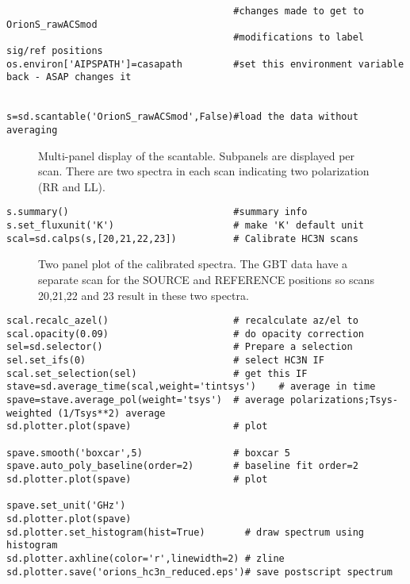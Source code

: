 \begin{verbatim}
                                        #changes made to get to OrionS_rawACSmod
                                        #modifications to label sig/ref positions
os.environ['AIPSPATH']=casapath         #set this environment variable back - ASAP changes it


s=sd.scantable('OrionS_rawACSmod',False)#load the data without averaging                
\end{verbatim}
\normalsize

\begin{figure}[h!]
\caption{\label{fig:scantable} Multi-panel display of the
  scantable. Subpanels are displayed per scan. There are two 
  spectra in each scan indicating two polarization (RR and LL).} 
\hrulefill
\end{figure}
 
\small
\begin{verbatim}
s.summary()                             #summary info                                   
s.set_fluxunit('K')                     # make 'K' default unit
scal=sd.calps(s,[20,21,22,23])          # Calibrate HC3N scans                          
\end{verbatim}
\normalsize

\begin{figure}[h!]
\caption{\label{fig:scal} Two panel plot of the calibrated
  spectra. The GBT data have a separate scan for the SOURCE and
  REFERENCE positions so scans 20,21,22 and 23 result in these two
  spectra.} 
\hrulefill
\end{figure}

\small
\begin{verbatim}
scal.recalc_azel()                      # recalculate az/el to                          
scal.opacity(0.09)                      # do opacity correction                         
sel=sd.selector()                       # Prepare a selection
sel.set_ifs(0)                          # select HC3N IF
scal.set_selection(sel)                 # get this IF
stave=sd.average_time(scal,weight='tintsys')    # average in time
spave=stave.average_pol(weight='tsys')  # average polarizations;Tsys-weighted (1/Tsys**2) average
sd.plotter.plot(spave)                  # plot

spave.smooth('boxcar',5)                # boxcar 5                                      
spave.auto_poly_baseline(order=2)       # baseline fit order=2                          
sd.plotter.plot(spave)                  # plot                                          

spave.set_unit('GHz')                                                                   
sd.plotter.plot(spave)
sd.plotter.set_histogram(hist=True)       # draw spectrum using histogram                 
sd.plotter.axhline(color='r',linewidth=2) # zline                                       
sd.plotter.save('orions_hc3n_reduced.eps')# save postscript spectrum                    
\end{verbatim}
\normalsize

